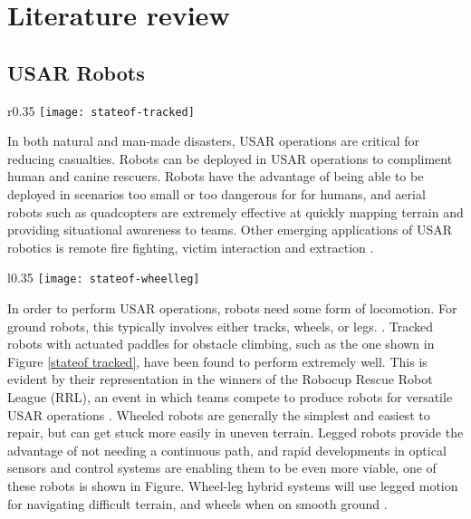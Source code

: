  \chapter{Literature review}

\section{USAR Robots}

\begin{wrapfigure}{r}{0.35\textwidth} %
	\centering
	\texttt{[image: stateof-tracked]}
	\caption{A tracked USAR robot, with paddles for obstacle climbing \citep{stateof}}
	\label{stateof tracked}
\end{wrapfigure}

In both natural and man-made disasters, USAR operations are critical for reducing casualties. Robots can be deployed in USAR operations to compliment human and canine rescuers. Robots have the advantage of being able to be deployed in scenarios too small or too dangerous for for humans, and aerial robots such as quadcopters are extremely effective at quickly mapping terrain and providing situational awareness to teams. Other emerging applications of USAR robotics is remote fire fighting, victim interaction and extraction \citep{stateof}.\\

\begin{wrapfigure}{l}{0.35\textwidth} %
	\centering
	\texttt{[image: stateof-wheelleg]}
	\caption{ANYmal, a legged USAR robot \citep{stateof}}
	\label{stateof wheelleg}
\end{wrapfigure}

In order to perform USAR operations, robots need some form of locomotion. For ground robots, this typically involves either tracks, wheels, or legs. \citep{stateof}. Tracked robots with actuated paddles for obstacle climbing, such as the one shown in Figure \ref{stateof tracked}, have been found to perform extremely well. This is evident by their representation in the winners of the Robocup Rescue Robot League (RRL), an event in which teams compete to produce robots for versatile USAR operations \citep{Sheh-2016}. Wheeled robots are generally the simplest and easiest to repair, but can get stuck more easily in uneven terrain. Legged robots provide the advantage of not needing a continuous path, and rapid developments in optical sensors and control systems are enabling them to be even more viable, one of these robots is shown in Figure. Wheel-leg hybrid systems will use legged motion for navigating difficult terrain, and wheels when on smooth ground \citep{stateof}. 


